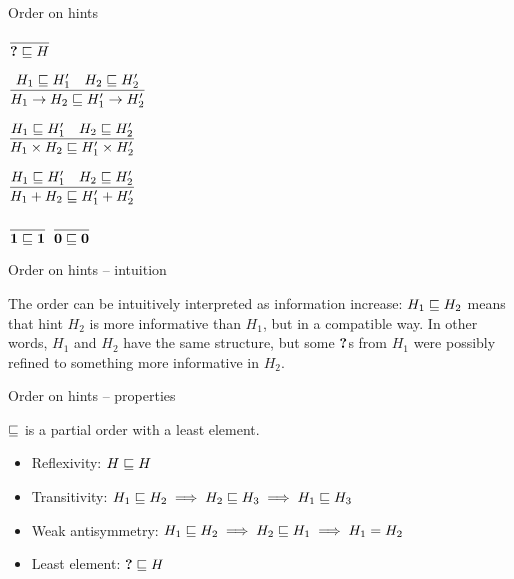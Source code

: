 \documentclass{beamer}
\begin{document}
\begin{frame}{Order on hints}

\begin{center}
  $\displaystyle \frac{}{\textbf{?} \sqsubseteq H} \textsc{\footnotesize{}}$

  \vspace{2em}

  $\displaystyle \frac{H_1 \sqsubseteq H_1' \quad H_2 \sqsubseteq H_2'}{H_1 \to H_2 \sqsubseteq H'_1 \to H'_2} \textsc{\footnotesize{}}$

  \vspace{2em}

  $\displaystyle \frac{H_1 \sqsubseteq H_1' \quad H_2 \sqsubseteq H_2'}{H_1 \times H_2 \sqsubseteq H_1' \times H_2'} \textsc{\footnotesize{}}$

  \vspace{2em}

  $\displaystyle \frac{H_1 \sqsubseteq H_1' \quad H_2 \sqsubseteq H_2'}{H_1 + H_2 \sqsubseteq H_1' + H_2'} \textsc{\footnotesize{}}$

  \vspace{2em}

  $\displaystyle \frac{}{\textbf{1} \sqsubseteq \textbf{1}} \textsc{\footnotesize{}}$ \quad
  $\displaystyle \frac{}{\textbf{0} \sqsubseteq \textbf{0}} \textsc{\footnotesize{}}$
\end{center}

\end{frame}

\begin{frame}{Order on hints -- intuition}

The order can be intuitively interpreted as information increase: $H_1 \sqsubseteq H_2$ means that hint $H_2$ is more informative than $H_1$, but in a compatible way. In other words, $H_1$ and $H_2$ have the same structure, but some $\textbf{?}$s from $H_1$ were possibly refined to something more informative in $H_2$.

\end{frame}

\begin{frame}{Order on hints -- properties}

$\sqsubseteq$ is a partial order with a least element.

\begin{itemize}
  \item Reflexivity: $H \sqsubseteq H$
  \item Transitivity: $H_1 \sqsubseteq H_2 \implies H_2 \sqsubseteq H_3 \implies H_1 \sqsubseteq H_3$
  \item Weak antisymmetry: $H_1 \sqsubseteq H_2 \implies H_2 \sqsubseteq H_1 \implies H_1 = H_2$
  \item Least element: $\textbf{?} \sqsubseteq H$
\end{itemize}

\end{frame}
\end{document}
